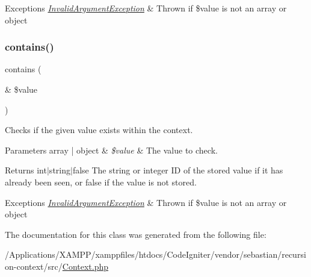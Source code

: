 \begin{DoxyExceptions}{Exceptions}
{\em \mbox{\hyperlink{class_sebastian_bergmann_1_1_recursion_context_1_1_invalid_argument_exception}{Invalid\+Argument\+Exception}}} & Thrown if \$value is not an array or object \\
\hline
\end{DoxyExceptions}
\mbox{\label{class_sebastian_bergmann_1_1_recursion_context_1_1_context_ab5894516f0a3adabdf1e5579d9ede76d}} 
\subsubsection{\texorpdfstring{contains()}{contains()}}
{\footnotesize\ttfamily contains (\begin{DoxyParamCaption}\item[{\&}]{\$value }\end{DoxyParamCaption})}

Checks if the given value exists within the context.


\begin{DoxyParams}[1]{Parameters}
array | object & {\em \$value} & The value to check.\\
\hline
\end{DoxyParams}
\begin{DoxyReturn}{Returns}
int$\vert$string$\vert$false The string or integer ID of the stored value if it has already been seen, or false if the value is not stored.
\end{DoxyReturn}

\begin{DoxyExceptions}{Exceptions}
{\em \mbox{\hyperlink{class_sebastian_bergmann_1_1_recursion_context_1_1_invalid_argument_exception}{Invalid\+Argument\+Exception}}} & Thrown if \$value is not an array or object \\
\hline
\end{DoxyExceptions}


The documentation for this class was generated from the following file\+:\begin{DoxyCompactItemize}
\item 
/\+Applications/\+X\+A\+M\+P\+P/xamppfiles/htdocs/\+Code\+Igniter/vendor/sebastian/recursion-\/context/src/\mbox{\hyperlink{sebastian_2recursion-context_2src_2_context_8php}{Context.\+php}}\end{DoxyCompactItemize}
